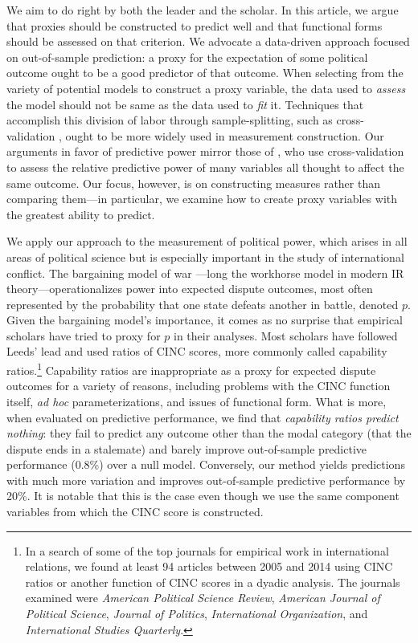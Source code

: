 We aim to do right by both the leader and the scholar.
In this article, we argue that proxies should be constructed to predict well and that functional forms should be assessed on that criterion.
We advocate a data-driven approach focused on out-of-sample prediction: a proxy for the expectation of some political outcome ought to be a good predictor of that outcome.
When selecting from the variety of potential models to construct a proxy variable, the data used to \emph{assess} the model should not be same as the data used to \emph{fit} it.
Techniques that accomplish this division of labor through sample-splitting, such as cross-validation \citep{Efron:2012es}, ought to be more widely used in measurement construction.
Our arguments in favor of predictive power mirror those of \citet{Hill:2014ki}, who use cross-validation to assess the relative predictive power of many variables all thought to affect the same outcome.
Our focus, however, is on constructing measures rather than comparing them---in particular, we examine how to create proxy variables with the greatest ability to predict.

We apply our approach to the measurement of political power, which arises in all areas of political science but is especially important in the study of international conflict.
The bargaining model of war \citep{fearon1995}---long the workhorse model in modern IR theory---operationalizes power into expected dispute outcomes, most often represented by the probability that one state defeats another in battle, denoted $p$.
Given the bargaining model's importance, it comes as no surprise that empirical scholars have tried to proxy for $p$ in their analyses.
Most scholars have followed Leeds' lead and used ratios of CINC scores, more commonly called capability ratios.\footnote{
  \label{fn:replications}
  In a search of some of the top journals for empirical work in international relations, we found at least 94 articles between 2005 and 2014 using CINC ratios or another function of CINC scores in a dyadic analysis.
  The journals examined were \emph{American Political Science Review}, \emph{American Journal of Political Science}, \emph{Journal of Politics}, \emph{International Organization}, and \emph{International Studies Quarterly}.
}
Capability ratios are inappropriate as a proxy for expected dispute outcomes for a variety of reasons, including problems with the CINC function itself, \emph{ad hoc} parameterizations, and issues of functional form.
What is more, when evaluated on predictive performance, we find that \emph{capability ratios predict nothing}: they fail to predict any outcome other than the modal category (that the dispute ends in a stalemate) and barely improve out-of-sample predictive performance (0.8\%) over a null model.
Conversely, our method yields predictions with much more variation and improves out-of-sample predictive performance by 20\%.
It is notable that this is the case even though we use the same component variables from which the CINC score is constructed.

